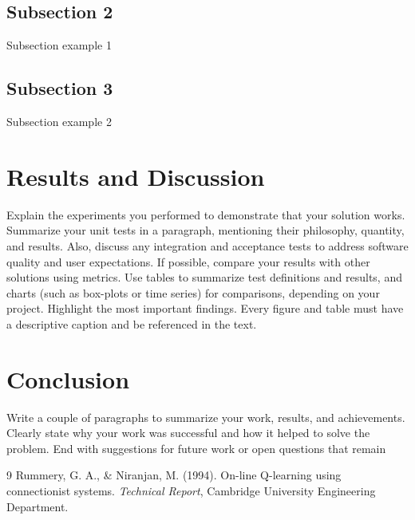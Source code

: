 \documentclass{article}
\begin{document}
\subsection{Subsection 2}
Subsection example 1

\subsection{Subsection 3}
Subsection example 2

\section{Results and Discussion}
Explain the experiments you performed to demonstrate
that your solution works. Summarize your unit tests in a paragraph, mentioning their
philosophy, quantity, and results. Also, discuss any integration and acceptance tests to
address software quality and user expectations. If possible, compare your results with
other solutions using metrics. Use tables to summarize test definitions and results, and
charts (such as box-plots or time series) for comparisons, depending on your project.
Highlight the most important findings. Every figure and table must have a descriptive
caption and be referenced in the text.

\section{Conclusion}
Write a couple of paragraphs to summarize your work, results, and
achievements. Clearly state why your work was successful and how it helped to solve
the problem. End with suggestions for future work or open questions that remain

\begin{thebibliography}{9}
Rummery, G. A., \& Niranjan, M. (1994). On-line Q-learning using connectionist systems. \textit{Technical Report}, Cambridge University Engineering Department.


\end{thebibliography}
\end{document}
